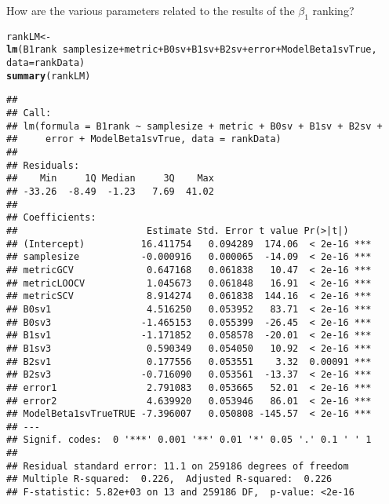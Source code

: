 \documentclass{article}\usepackage[]{graphicx}\usepackage[]{color}
\makeatletter
\newcommand{\hlopt}[1]{\textcolor[rgb]{0,0,0}{#1}}%
\newcommand{\hlstd}[1]{\textcolor[rgb]{0.345,0.345,0.345}{#1}}%
\newcommand{\hlkwb}[1]{\textcolor[rgb]{0.69,0.353,0.396}{#1}}%
\newcommand{\hlkwc}[1]{\textcolor[rgb]{0.333,0.667,0.333}{#1}}%
\newcommand{\hlkwd}[1]{\textcolor[rgb]{0.737,0.353,0.396}{\textbf{#1}}}%
\newenvironment{kframe}{%
 \def\at@end@of@kframe{}%
 \ifinner\ifhmode%
  \def\at@end@of@kframe{\end{minipage}}%
  \begin{minipage}{\columnwidth}%
 \fi\fi%
 \def\FrameCommand##1{\hskip\@totalleftmargin \hskip-\fboxsep
 \colorbox{shadecolor}{##1}\hskip-\fboxsep
     \hskip-\linewidth \hskip-\@totalleftmargin \hskip\columnwidth}%
 \MakeFramed {\advance\hsize-\width
   \@totalleftmargin\z@ \linewidth\hsize
   \@setminipage}}%
 {\par\unskip\endMakeFramed%
 \at@end@of@kframe}
\newenvironment{knitrout}{}{} %
\makeatother
\begin{document}
How are the various parameters related to the results of the $\beta _1$ ranking?
\begin{knitrout}
\color{fgcolor}\begin{kframe}
\begin{alltt}
\hlstd{rankLM} \hlkwb{<-} \hlkwd{lm}\hlstd{(B1rank} \hlopt{~} \hlstd{samplesize} \hlopt{+} \hlstd{metric} \hlopt{+} \hlstd{B0sv} \hlopt{+} \hlstd{B1sv} \hlopt{+} \hlstd{B2sv} \hlopt{+} \hlstd{error} \hlopt{+} \hlstd{ModelBeta1svTrue,}
    \hlkwc{data} \hlstd{= rankData)}
\hlkwd{summary}\hlstd{(rankLM)}
\end{alltt}
\begin{verbatim}
## 
## Call:
## lm(formula = B1rank ~ samplesize + metric + B0sv + B1sv + B2sv + 
##     error + ModelBeta1svTrue, data = rankData)
## 
## Residuals:
##    Min     1Q Median     3Q    Max 
## -33.26  -8.49  -1.23   7.69  41.02 
## 
## Coefficients:
##                       Estimate Std. Error t value Pr(>|t|)    
## (Intercept)          16.411754   0.094289  174.06  < 2e-16 ***
## samplesize           -0.000916   0.000065  -14.09  < 2e-16 ***
## metricGCV             0.647168   0.061838   10.47  < 2e-16 ***
## metricLOOCV           1.045673   0.061848   16.91  < 2e-16 ***
## metricSCV             8.914274   0.061838  144.16  < 2e-16 ***
## B0sv1                 4.516250   0.053952   83.71  < 2e-16 ***
## B0sv3                -1.465153   0.055399  -26.45  < 2e-16 ***
## B1sv1                -1.171852   0.058578  -20.01  < 2e-16 ***
## B1sv3                 0.590349   0.054050   10.92  < 2e-16 ***
## B2sv1                 0.177556   0.053551    3.32  0.00091 ***
## B2sv3                -0.716090   0.053561  -13.37  < 2e-16 ***
## error1                2.791083   0.053665   52.01  < 2e-16 ***
## error2                4.639920   0.053946   86.01  < 2e-16 ***
## ModelBeta1svTrueTRUE -7.396007   0.050808 -145.57  < 2e-16 ***
## ---
## Signif. codes:  0 '***' 0.001 '**' 0.01 '*' 0.05 '.' 0.1 ' ' 1
## 
## Residual standard error: 11.1 on 259186 degrees of freedom
## Multiple R-squared:  0.226,	Adjusted R-squared:  0.226 
## F-statistic: 5.82e+03 on 13 and 259186 DF,  p-value: <2e-16
\end{verbatim}
\end{kframe}
\end{knitrout}
\end{document}
